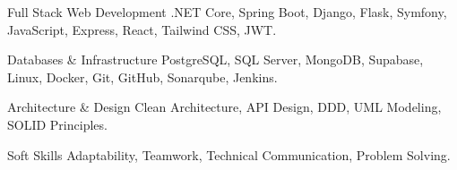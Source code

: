 

\begin{cvskills}

  \cvskill
    {Full Stack Web Development} %
    {.NET Core, Spring Boot, Django, Flask, Symfony, JavaScript, Express, React, Tailwind CSS, JWT.} %

  \cvskill
    {Databases \& Infrastructure} %
    {PostgreSQL, SQL Server, MongoDB, Supabase, Linux, Docker, Git, GitHub, Sonarqube, Jenkins.} %

  \cvskill
    {Architecture \& Design} %
    {Clean Architecture, API Design, DDD, UML Modeling, SOLID Principles.} %

  \cvskill
    {Soft Skills} %
    {Adaptability, Teamwork, Technical Communication, Problem Solving.} %

\end{cvskills}